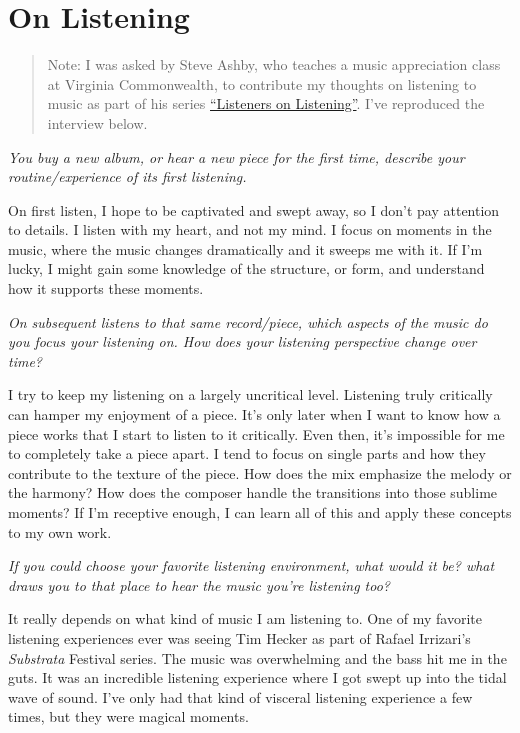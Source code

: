 \documentclass[
]{book}
\begin{document}
\hypertarget{on-listening}{%
\chapter{On Listening}\label{on-listening}}

\begin{quote}
Note: I was asked by Steve Ashby, who teaches a music appreciation class at Virginia Commonwealth, to contribute my thoughts on listening to music as part of his series \href{http://rampages.us/mhis243/listeners-on-listening/ted-laderas/}{``Listeners on Listening''}. I've reproduced the interview below.
\end{quote}

\emph{You buy a new album, or hear a new piece for the first time, describe your routine/experience of its first listening.}

On first listen, I hope to be captivated and swept away, so I don't pay attention to details. I listen with my heart, and not my mind. I focus on moments in the music, where the music changes dramatically and it sweeps me with it. If I'm lucky, I might gain some knowledge of the structure, or form, and understand how it supports these moments.

\emph{On subsequent listens to that same record/piece, which aspects of the music do you focus your listening on. How does your listening perspective change over time?}

I try to keep my listening on a largely uncritical level. Listening truly critically can hamper my enjoyment of a piece. It's only later when I want to know how a piece works that I start to listen to it critically. Even then, it's impossible for me to completely take a piece apart. I tend to focus on single parts and how they contribute to the texture of the piece. How does the mix emphasize the melody or the harmony? How does the composer handle the transitions into those sublime moments? If I'm receptive enough, I can learn all of this and apply these concepts to my own work.

\emph{If you could choose your favorite listening environment, what would it be? what draws you to that place to hear the music you're listening too?}

It really depends on what kind of music I am listening to. One of my favorite listening experiences ever was seeing Tim Hecker as part of Rafael Irrizari's \emph{Substrata} Festival series. The music was overwhelming and the bass hit me in the guts. It was an incredible listening experience where I got swept up into the tidal wave of sound. I've only had that kind of visceral listening experience a few times, but they were magical moments.
\end{document}
